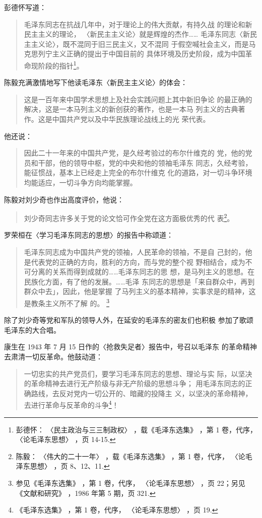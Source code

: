 彭德怀写道：
\begin{quote}
	\fzwkai 毛泽东同志在抗战几年中，对于理论上的伟大贡献，有持久战
的理论和新民主主义的理论，
〈新民主主义论〉就是辉煌的杰作……
毛泽东同志〈新民主主义论〉，既不混同于旧三民主义，又不混同
于假空喊社会主义，而是马克思列宁主义正确的提出于中国目前的
具体环境及历史阶段，成为中国革命现阶段的指针\footnote{彭德怀：
〈民主政治与三三制政权〉
，载《毛泽东选集》
，第 1 卷，代序，
〈论毛泽东思想〉
，页 14-15.}。
\end{quote}

陈毅充满激情地写下他读毛泽东〈新民主主义论〉的体会：
\begin{quote}
	\fzwkai 这是一百年来中国学术思想上及社会实践问题上其中新旧争论
的最正确的解决，这是一本马列主义的新创获的著作，也是一本马
列主义的古典著作。这是中国共产党以及中华民族理论战线上的光
荣代表。
\end{quote}

他还说：
\begin{quote}
	\fzwkai 
因此二十一年来的中国共产党，是久经考验过的布尔什维克的
党，他的党员和干部，他的领导中枢，党的中央和他的领袖毛泽东
同志，久经考验，能征惯战，基本上已经走上完全的布尔什维克
化的道路，对一切斗争环境均能适应，一切斗争方向均能掌握。
\end{quote}

陈毅对刘少奇也作出高度评价，他说：
\begin{quote}
	\fzwkai 刘少奇同志许多关于党的论文恰可作全党在这方面极优秀的代
	表\footnote{陈毅：
〈伟大的二十一年〉
，载《毛泽东选集》
，第 1 卷，代序，
〈论毛泽东思想〉
，页 8、12、11.}。
\end{quote}

罗荣桓在〈学习毛泽东同志的思想〉的报告中称颂道：
\begin{quote}
	\fzwkai 毛泽东同志成为中国共产党的领袖，人民革命的领袖，不是自
己封的，他是代表党的正确的方向，胜利的方向，而与党的整个视
野相结合，成为不可分离的关系而得到成就的……毛泽东同志的思
想，是马列主义的思想。在民族化方面，有了他的发展。……毛泽
东同志的思想是「来自群众中，再到群众中去」，因此，他是掌握
了马列主义的基本精神，实事求是的精神，这是教条主义所不了解
的。
\footnote{参见《毛泽东选集》
，第 1 卷，代序，
〈论毛泽东思想〉
，页 22；另见《文献和研究》
，1986 年第 5 期，页 321.}
\end{quote}

除了刘少奇等党和军队的领导人外，在延安的毛泽东的密友们也积极
参加了歌颂毛泽东的大合唱。

康生在 1943 年 7 月 15 日作的〈抢救失足者〉报告中，号召以毛泽东
的革命精神去肃清一切反革命。他鼓动道：
\begin{quote}
	\fzwkai 一切忠实的共产党员们，要学习毛泽东同志的思想、理论与实
际，以坚决的革命精神去进行无产阶级与非无产阶级的思想斗争；
用毛泽东同志的正确路线，去反对党内一切公开的、暗藏的投降主
义，以坚决的革命精神，去进行革命与反革命的斗争\footnote{《毛泽东选集》
，第 1 卷，代序，
〈论毛泽东思想〉
，页 19.}！
\end{quote}

